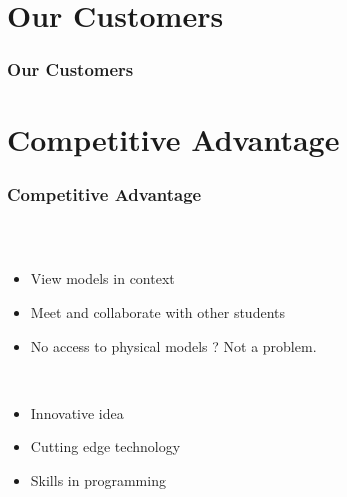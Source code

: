\section{Our Customers}

\begin{frame}
  \frametitle{Our Customers}
\end{frame}

\section{Competitive Advantage}

\begin{frame}
  \frametitle{Competitive Advantage}
  \begin{columns}
    \begin{column}{0.8\textwidth}
      \begin{description}[]
        \item[Integration of Course room and Model Viewing] \hfill \\
        \begin{itemize}
          \item  View models in context
          \item Meet and collaborate with other students
          \item No access to physical models ? Not a problem.
        \end{itemize}

        \bigskip
        \item[Our Strengths ] \hfill \\
          \begin{itemize}
            \item Innovative idea
            \item Cutting edge technology
            \item Skills in programming 
        \end{itemize}
      \end{description}
    \end{column}


\end{columns}
\end{frame}
